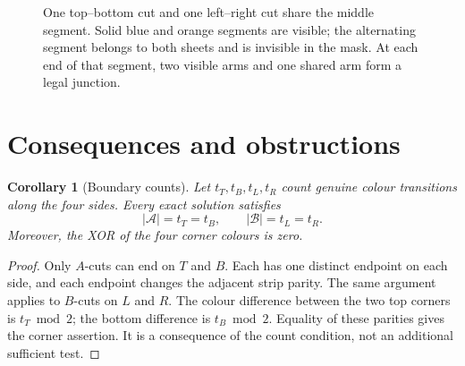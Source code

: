 \documentclass[11pt,a4paper]{article}
\newtheorem{corollary}[theorem]{Corollary}
\theoremstyle{definition}
\begin{document}
\begin{figure}[htbp]
\centering
{}
\caption{One top--bottom cut and one left--right cut share the middle segment.
Solid blue and orange segments are visible; the alternating segment belongs
to both sheets and is invisible in the mask. At each end of that segment,
two visible arms and one shared arm form a legal junction.}
\label{fig:completion}
\end{figure}

\section{Consequences and obstructions}
\begin{corollary}[Boundary counts]\label{cor:counts}
Let $t_T,t_B,t_L,t_R$ count genuine colour transitions along the four sides.
Every exact solution satisfies
\[
  |\mathcal A|=t_T=t_B,\qquad |\mathcal B|=t_L=t_R.
\]
Moreover, the XOR of the four corner colours is zero.
\end{corollary}
\begin{proof}
Only $A$-cuts can end on $T$ and $B$. Each has one distinct endpoint on each
side, and each endpoint changes the adjacent strip parity. The same argument
applies to $B$-cuts on $L$ and $R$. The colour difference between the two top
corners is $t_T\bmod 2$; the bottom difference is $t_B\bmod 2$. Equality of
these parities gives the corner assertion. It is a consequence of the count
condition, not an additional sufficient test.
\end{proof}
\end{document}
